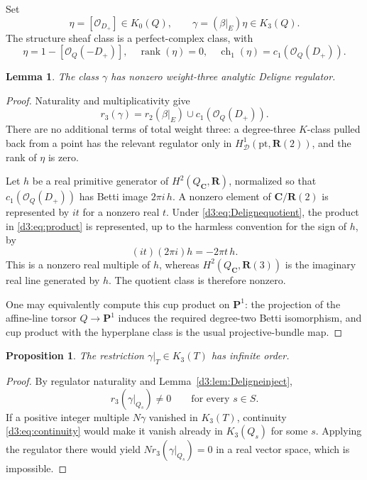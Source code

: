 \documentclass[11pt,a4paper]{amsart}
\numberwithin{equation}{section}
\newtheorem{lemma}[theorem]{Lemma}
\newtheorem{proposition}[theorem]{Proposition}
\theoremstyle{definition}
\theoremstyle{remark}
\newcommand{\R}{\mathbf R}
\newcommand{\C}{\mathbf C}
\newcommand{\PP}{\mathbf P}
\newcommand{\OO}{\mathcal O}
\begin{document}
Set
\[
\eta=[\OO_{D_+}]\in K_0(Q),\qquad
\gamma=(\beta|_E)\eta\in K_3(Q).
\]
The structure sheaf class is a perfect-complex class, with
\[
\eta=1-[\OO_Q(-D_+)],\quad \operatorname{rank}(\eta)=0,\quad
\operatorname{ch}_1(\eta)=c_1(\OO_Q(D_+)).
\]

\begin{lemma}\label{d3:lem:product}
The class $\gamma$ has nonzero weight-three analytic Deligne regulator.
\end{lemma}
\begin{proof}
Naturality and multiplicativity give
\begin{equation}\label{d3:eq:product}
r_3(\gamma)=r_2(\beta|_E)\cup c_1(\OO_Q(D_+)).
\end{equation}
There are no additional terms of total weight three: a degree-three $K$-class pulled back from a point has the relevant regulator only in $H^1_{\mathcal D}(\mathrm{pt},\R(2))$, and the rank of $\eta$ is zero.

Let $h$ be a real primitive generator of $H^2(Q_{\C},\R)$, normalized so that $c_1(\OO_Q(D_+))$ has Betti image $2\pi i\,h$. A nonzero element of $\C/\R(2)$ is represented by $it$ for a nonzero real $t$. Under \eqref{d3:eq:Delignequotient}, the product in \eqref{d3:eq:product} is represented, up to the harmless convention for the sign of $h$, by
\[
(it)(2\pi i)h=-2\pi t\,h.
\]
This is a nonzero real multiple of $h$, whereas $H^2(Q_{\C},\R(3))$ is the imaginary real line generated by $h$. The quotient class is therefore nonzero.

One may equivalently compute this cup product on $\PP^1$: the projection of the affine-line torsor $Q\to\PP^1$ induces the required degree-two Betti isomorphism, and cup product with the hyperplane class is the usual projective-bundle map.
\end{proof}

\begin{proposition}\label{d3:prop:infinite}
The restriction $\gamma|_T\in K_3(T)$ has infinite order.
\end{proposition}
\begin{proof}
By regulator naturality and Lemma~\ref{d3:lem:Deligneinject},
\[
r_3(\gamma|_{Q_s})\neq 0
\qquad\text{for every }s\in S.
\]
If a positive integer multiple $N\gamma$ vanished in $K_3(T)$, continuity \eqref{d3:eq:continuity} would make it vanish already in $K_3(Q_s)$ for some $s$. Applying the regulator there would yield $N r_3(\gamma|_{Q_s})=0$ in a real vector space, which is impossible.
\end{proof}
\end{document}
